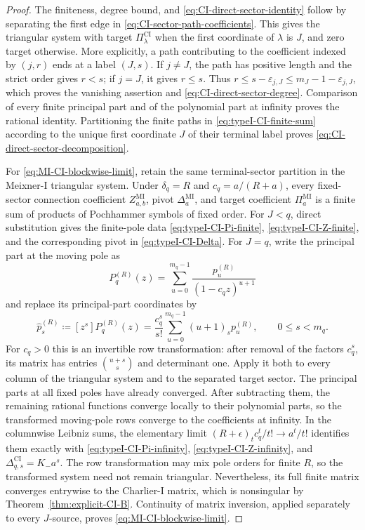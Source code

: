 \documentclass[10pt]{amsart}
\theoremstyle{plain}
\theoremstyle{definition}
\theoremstyle{remark}
\begin{document}
\begin{proof}
The finiteness, degree bound, and
\eqref{eq:CI-direct-sector-identity} follow by separating the first
edge in \eqref{eq:CI-sector-path-coefficients}. This gives the triangular
system with target \(\Pi_\lambda^{\mathrm{CI}}\) when the first
coordinate of \(\lambda\) is \(J\), and zero target otherwise.
More explicitly, a path contributing to the coefficient indexed by
\((j,r)\) ends at a label \((J,s)\). If \(j\ne J\), the path has positive
length and the strict order gives \(r<s\); if \(j=J\), it gives \(r\le s\).
Thus \(r\le s-\varepsilon_{j,J}\le
m_J-1-\varepsilon_{j,J}\), which proves the vanishing assertion and
\eqref{eq:CI-direct-sector-degree}.
Comparison of every finite principal part and of the polynomial part at
infinity proves the rational identity. Partitioning the finite paths in
\eqref{eq:typeI-CI-finite-sum} according to the unique first coordinate
\(J\) of their terminal label proves
\eqref{eq:CI-direct-sector-decomposition}.

For \eqref{eq:MI-CI-blockwise-limit}, retain the same terminal-sector
partition in the Meixner-I triangular system. Under
\(\delta_q=R\) and \(c_q=a/(R+a)\), every fixed-sector connection
coefficient \(Z_{a,b}^{\mathrm{MI}}\), pivot
\(\Delta_a^{\mathrm{MI}}\), and target coefficient
\(\Pi_a^{\mathrm{MI}}\) is a finite sum of products of Pochhammer
symbols of fixed order. For \(J<q\), direct substitution gives the
finite-pole data
\eqref{eq:typeI-CI-Pi-finite}, \eqref{eq:typeI-CI-Z-finite}, and the
corresponding pivot in \eqref{eq:typeI-CI-Delta}. For \(J=q\), write the
principal part at the moving pole as
\[
 P_q^{(R)}(z)=\sum_{u=0}^{m_q-1}
 \frac{p_u^{(R)}}{(1-c_qz)^{u+1}}
\]
and replace its principal-part coordinates by
\begin{equation}
 \widehat p_s^{(R)}
 \coloneq[z^s]P_q^{(R)}(z)
 =\frac{c_q^s}{s!}\sum_{u=0}^{m_q-1}(u+1)_s p_u^{(R)},
 \qquad 0\le s<m_q.
 \label{eq:MI-CI-moving-pole-row-transform}
\end{equation}
For \(c_q>0\) this is an invertible row transformation: after removal
of the factors \(c_q^s\), its matrix has entries
\(\binom{u+s}{s}\) and determinant one. Apply it both to every column
of the triangular system and to the separated target sector. The
principal parts at all fixed poles have already converged. After
subtracting them, the remaining rational functions converge locally to
their polynomial parts, so the transformed moving-pole rows converge to
the coefficients at infinity. In the columnwise Leibniz sums, the
elementary limit
\((R+\epsilon)_t c_q^t/t!\to a^t/t!\) identifies them exactly with
\eqref{eq:typeI-CI-Pi-infinity}, \eqref{eq:typeI-CI-Z-infinity}, and
\(\Delta_{q,s}^{\mathrm{CI}}=K_-a^s\).
The row transformation may mix pole orders for finite \(R\), so the
transformed system need not remain triangular. Nevertheless, its full
finite matrix converges entrywise to the Charlier-I matrix, which is
nonsingular by Theorem~\ref{thm:explicit-CI-B}. Continuity of matrix
inversion, applied separately to every \(J\)-source, proves
\eqref{eq:MI-CI-blockwise-limit}.
\end{proof}
\end{document}
